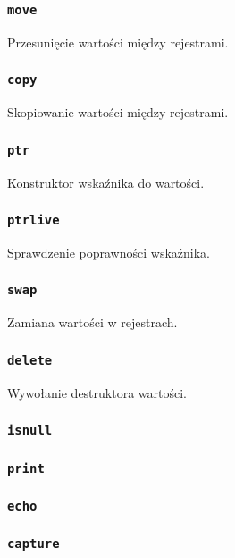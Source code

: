 \subsubsection{\texttt{move}}

Przesunięcie wartości między rejestrami.

\subsubsection{\texttt{copy}}

Skopiowanie wartości między rejestrami.

\subsubsection{\texttt{ptr}}

Konstruktor wskaźnika do wartości.

\subsubsection{\texttt{ptrlive}}

Sprawdzenie poprawności wskaźnika.

\subsubsection{\texttt{swap}}

Zamiana wartości w rejestrach.

\subsubsection{\texttt{delete}}

Wywołanie destruktora wartości.

\subsubsection{\texttt{isnull}}

\subsubsection{\texttt{print}}
\subsubsection{\texttt{echo}}

\subsubsection{\texttt{capture}}
